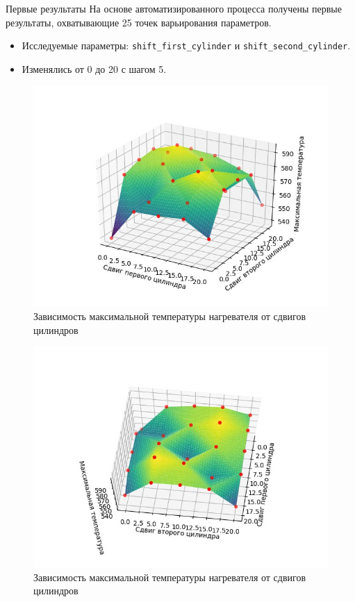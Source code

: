 \documentclass{beamer}
\begin{document}
\begin{frame}{Первые результаты}
	На основе автоматизированного процесса получены первые результаты, охватывающие 25 точек варьирования параметров.

	\vspace{1em}
	\begin{itemize}
		\item Исследуемые параметры: \texttt{shift\_first\_cylinder} и \texttt{shift\_second\_cylinder}.
		\item Изменялись от 0 до 20 с шагом 5.
	\end{itemize}

	\begin{figure}[h]
		\centering
		\includegraphics[width=0.4\linewidth]{16.1.jpg}
		\caption{Зависимость максимальной температуры нагревателя от сдвигов цилиндров}
	\end{figure}

	\begin{figure}[h]
		\centering
		\includegraphics[width=0.4\linewidth]{16.2.jpg}
		\caption{Зависимость максимальной температуры нагревателя от сдвигов цилиндров}
	\end{figure}
\end{frame}
\end{document}
